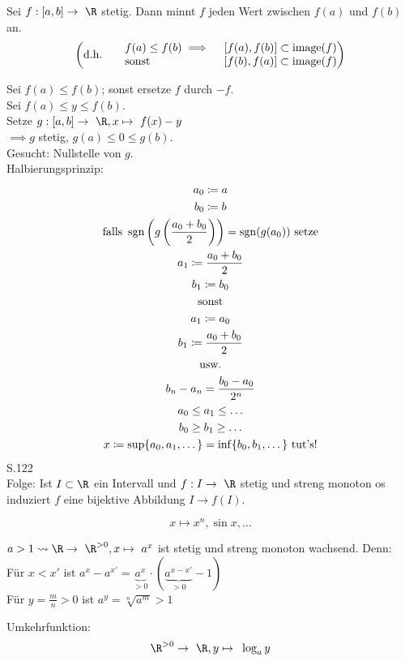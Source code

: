 \begin{satz*}[note = Zwischenwertsatz]
	Sei $f: [a,b] \rightarrow \R$ stetig. Dann minnt $f$ jeden Wert zwischen $f(a)$ und $f(b)$ an.\\
	\[
		\left( \text{d.h.} \qquad \begin{matrix*}[l]
			f(a) \leq f(b) \implies	&[ f(a) , f(b) ] \subset \image(f)	\\
			\text{sonst }		&[ f(b) , f(a) ] \subset \image(f)
		\end{matrix*} \right)
	\]
	\begin{bew}
		Sei $f(a) \leq f(b)$; sonst ersetze $f$ durch $-f$.\\
		Sei $f(a) \leq y \leq f(b)$.\\
		Setze $g: [a,b] \rightarrow \R , x \mapsto f(x) - y$\\
		$\implies g$ stetig, $g(a) \leq 0 \leq g(b)$.\\
		Gesucht: Nullstelle von $g$.\\
		Halbierungsprinzip:
		\begin{gather*}
			a_0 \coloneqq a \\
			b_0 \coloneqq b \\
			\text{falls } \operatorname{sgn}\left( g\left( \frac{a_0 + b_0}{2} \right)\right) = \operatorname{sgn}(g(a_0)) \text{ setze} \\
			a_1 \coloneqq \frac{a_0 + b_0}{2} \\
			b_1 \coloneqq b_0 \\
			\text{sonst} \\
			a_1 \coloneqq a_0 \\
			b_1 \coloneqq \frac{a_0 + b_0}{2} \\
			\text{usw.} \\
			b_n - a_n = \frac{b_0 - a_0}{2^n} \\
			a_0 \leq a_1 \leq \dots \\
			b_0 \geq b_1 \geq \dots \\
			x \coloneqq \sup\{ a_0 , a_1, \dotsc \} = \inf\{ b_0, b_1, \dotsc \} \text{ tut's!}
		\end{gather*}
		S.122\\
		Folge: Ist $I \subset \R$ ein Intervall und $f: I \rightarrow \R$ stetig und streng monoton os induziert $f$ eine bijektive Abbildung $I \rightarrow f(I)$.\\
		\begin{bsp*}
			\[ x \mapsto x^n , \sin x , \dotsc \]
		\end{bsp*}
	\end{bew}
\end{satz*}
\begin{bsp*}
	$a > 1 \rightsquigarrow \R \rightarrow \R^{>0} ,x \mapsto a^x$ ist stetig und streng monoton wachsend. Denn:\\
	Für $x < x'$ ist $a^x - a^{x'} = \underbrace{a^x}_{>0} \cdot (\underbrace{a^{x-x'}}_{>0} - 1 )$ \\
	Für $y = \frac{m}{n} > 0$ ist $a^y = \sqrt[n]{a^m} > 1$
\end{bsp*}
Umkehrfunktion:
\[ \R^{>0} \rightarrow \R, y \mapsto \log_a y \]

